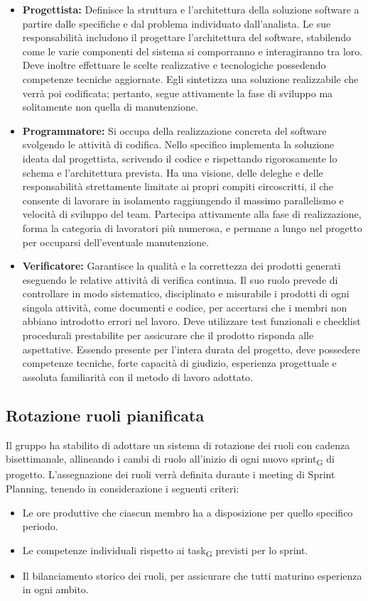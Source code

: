 \documentclass[11pt, a4paper]{article}
\begin{document}
\begin{itemize}
		\item \textbf{Progettista:} Definisce la struttura e l'architettura della soluzione software a partire dalle specifiche e dal problema individuato dall'analista. Le sue responsabilità includono il progettare l'architettura del software, stabilendo come le varie componenti del sistema si comporranno e interagiranno tra loro. Deve inoltre effettuare le scelte realizzative e tecnologiche possedendo competenze tecniche aggiornate. Egli sintetizza una soluzione realizzabile che verrà poi codificata; pertanto, segue attivamente la fase di sviluppo ma solitamente non quella di manutenzione.
		
		\item \textbf{Programmatore:} Si occupa della realizzazione concreta del software svolgendo le attività di codifica. Nello specifico implementa la soluzione ideata dal progettista, scrivendo il codice e rispettando rigorosamente lo schema e l'architettura prevista. Ha una visione, delle deleghe e delle responsabilità strettamente limitate ai propri compiti circoscritti, il che consente di lavorare in isolamento raggiungendo il massimo parallelismo e velocità di sviluppo del team. Partecipa attivamente alla fase di realizzazione, forma la categoria di lavoratori più numerosa, e permane a lungo nel progetto per occuparsi dell'eventuale manutenzione.
		
		\item \textbf{Verificatore:} Garantisce la qualità e la correttezza dei prodotti generati eseguendo le relative attività di verifica continua. Il suo ruolo prevede di controllare in modo sistematico, disciplinato e misurabile i prodotti di ogni singola attività, come documenti e codice, per accertarsi che i membri non abbiano introdotto errori nel lavoro. Deve utilizzare test funzionali e checklist procedurali prestabilite per assicurare che il prodotto risponda alle aspettative. Essendo presente per l'intera durata del progetto, deve possedere competenze tecniche, forte capacità di giudizio, esperienza progettuale e assoluta familiarità con il metodo di lavoro adottato.
	\end{itemize}
	
	\subsection{Rotazione ruoli pianificata}
	Il gruppo ha stabilito di adottare un sistema di rotazione dei ruoli con cadenza bisettimanale, allineando i cambi di ruolo all'inizio di ogni nuovo sprint\textsubscript{G} di progetto. L'assegnazione dei ruoli verrà definita durante i meeting di Sprint Planning, tenendo in considerazione i seguenti criteri:
	\begin{itemize}
		\item Le ore produttive che ciascun membro ha a disposizione per quello specifico periodo.
		\item Le competenze individuali rispetto ai task\textsubscript{G} previsti per lo sprint.
		\item Il bilanciamento storico dei ruoli, per assicurare che tutti maturino esperienza in ogni ambito.
	\end{itemize}
	
\end{document}
